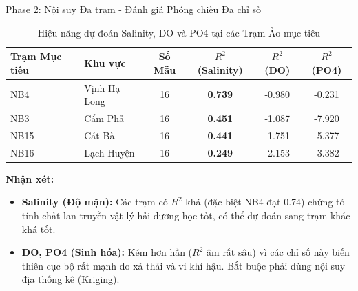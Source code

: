 \begin{frame}{Phase 2: Nội suy Đa trạm - Đánh giá Phóng chiếu Đa chỉ số}  
  \vspace{0.2cm}
  \begin{table}[]
    \caption{Hiệu năng dự đoán Salinity, DO và PO4 tại các Trạm Ảo mục tiêu}
    \centering
    \small
    \begin{tabular}{llcccc}
        \toprule
        \textbf{Trạm Mục tiêu} & \textbf{Khu vực} & \textbf{Số Mẫu} & \textbf{$R^2$ (Salinity)} & \textbf{$R^2$ (DO)} & \textbf{$R^2$ (PO4)} \\ \midrule
        NB4 & Vịnh Hạ Long & 16 & \textbf{0.739} & -0.980 & -0.231 \\
        NB3 & Cẩm Phả & 16 & \textbf{0.451} & -1.087 & -7.920 \\
        NB15 & Cát Bà & 16 & \textbf{0.441} & -1.751 & -5.377 \\
        NB16 & Lạch Huyện & 16 & \textbf{0.249} & -2.153 & -3.382 \\ \bottomrule
    \end{tabular}
  \end{table}

  \textbf{Nhận xét:}
  \begin{itemize}
      \item \textbf{Salinity (Độ mặn):} Các trạm có $R^2$ khá (đặc biệt NB4 đạt 0.74) chứng tỏ tính chất lan truyền vật lý hải dương học tốt, có thể dự đoán sang trạm khác khá tốt.
      \item \textbf{DO, PO4 (Sinh hóa):} Kém hơn hẳn ($R^2$ âm rất sâu) vì các chỉ số này biến thiên cục bộ rất mạnh do xả thải và vi khí hậu. Bắt buộc phải dùng nội suy địa thống kê (Kriging).
  \end{itemize}
\end{frame}

